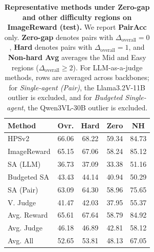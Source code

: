 \begin{table}[t]
\centering
\footnotesize
\setlength{\tabcolsep}{2.7pt}
\renewcommand{\arraystretch}{1.16}
\begin{tabular}{lcccc}
\toprule
\textbf{Method} & \textbf{Ovr.} & \textbf{Hard} & \textbf{Zero} & \textbf{NH} \\
\midrule
HPSv2                    & 66.06 & 68.22 & 59.34 & 84.73 \\
ImageReward              & 65.15 & 67.06 & 58.24 & 85.12 \\
\midrule
SA (LLM)                 & 36.73 & 37.09 & 33.38 & 51.16 \\
Budgeted SA              & 43.43 & 44.14 & 40.94 & 50.29 \\
SA (Pair)                & 63.09 & 64.30 & 58.96 & 75.65 \\
V. Judge                 & 41.47 & 42.03 & 37.95 & 55.37 \\
\midrule
Avg. Reward              & 65.61 & 67.64 & 58.79 & 84.92 \\
Avg. Judge               & 46.18 & 46.89 & 42.81 & 58.12 \\
Avg. All                 & 52.65 & 53.81 & 48.13 & 67.05 \\
\bottomrule
\end{tabular}
\caption{\textbf{Representative methods under Zero-gap and other difficulty regions on ImageReward (test).} We report \textbf{PairAcc} only. \textbf{Zero-gap} denotes pairs with $\Delta_{\mathrm{overall}}=0$, \textbf{Hard} denotes pairs with $\Delta_{\mathrm{overall}}=1$, and \textbf{Non-hard Avg} averages the Mid and Easy regions ($\Delta_{\mathrm{overall}}\geq2$). For LLM-as-a-judge methods, rows are averaged across backbones; for \textit{Single-agent (Pair)}, the Llama3.2V-11B outlier is excluded, and for \textit{Budgeted Single-agent}, the Qwen3VL-30B outlier is excluded.}
\label{tab:zero_gap_main}
\end{table}